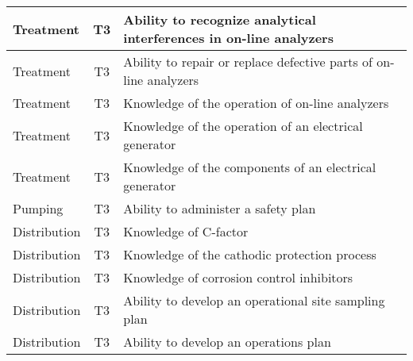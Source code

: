 \documentclass{article}
\begin{document}
\begin{table}[]
\begin{tabular}{|l|c|l|}
Treatment                              & T3             & Ability to recognize   analytical interferences in on-line analyzers                                                              \\ \hline
Treatment                              & T3             & Ability to repair or   replace defective parts of on-line analyzers                                                               \\ \hline
Treatment                              & T3             & Knowledge of the   operation of on-line analyzers                                                                                 \\ \hline
Treatment                              & T3             & Knowledge of the   operation of an electrical generator                                                                           \\ \hline
Treatment                              & T3             & Knowledge of the   components of an electrical generator                                                                          \\ \hline
Pumping                                & T3             & Ability to administer   a safety plan                                                                                             \\ \hline
Distribution                           & T3             & Knowledge of C-factor                                                                                                             \\ \hline
Distribution                           & T3             & Knowledge of the   cathodic protection process                                                                                    \\ \hline
Distribution                           & T3             & Knowledge of   corrosion control inhibitors                                                                                       \\ \hline
Distribution                           & T3             & Ability to develop an   operational site sampling plan                                                                            \\ \hline
Distribution                           & T3             & Ability to develop an   operations plan                                                                                           \\ \hline

\end{tabular}
\end{table}
\end{document}
